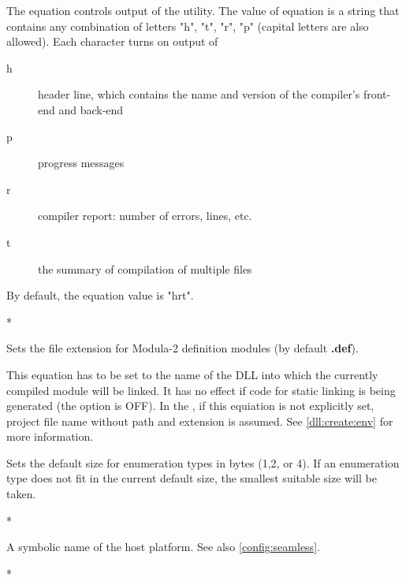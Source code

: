 \begin{description}
        The equation controls output of the \XC{} utility.
        The value of equation is a string
        that contains any combination of letters "h", "t",
        "r", "p" (capital letters are also allowed).
        Each character turns on output of
        \begin{description}
        \item[h]
                header line, which contains the name and version of
                the compiler's front-end and back-end
        \item[p]
                progress messages
        \item[r]
                compiler report: number of errors, lines, etc.
        \item[t]
                the summary of compilation of multiple files
        \end{description}

        By default, the equation value is "hrt".

        \MLBegin{}*\MLEnd{}

        Sets the file extension for Modula-2 definition modules (by
        default {\bf .def}).

\ifgencode
\ifdll
{}
        \MLBegin{}\ModeC{}\MLEnd{}

        This equation has to be set to the name of the DLL into which the
        currently compiled module will be linked. It has no effect if code
        for static linking is being generated (the  option is OFF).
        In the , if this equiation is
        not explicitly set, project file name without path and extension is assumed.
        See \ref{dll:create:env} for more information.
\fi
\fi

        \MLBegin{}\ModeC{}\MLEnd \inline

        Sets the default size for enumeration types in bytes (1,2, or 4).
        If an enumeration type does not fit in the current default size,
        the smallest suitable size will be taken.

        \MLBegin{}*\MLEnd{}

        A symbolic name of the host platform. \ifgenc See also \ref{config:seamless}.\fi %

        \MLBegin{}*\MLEnd{}


\end{description}

